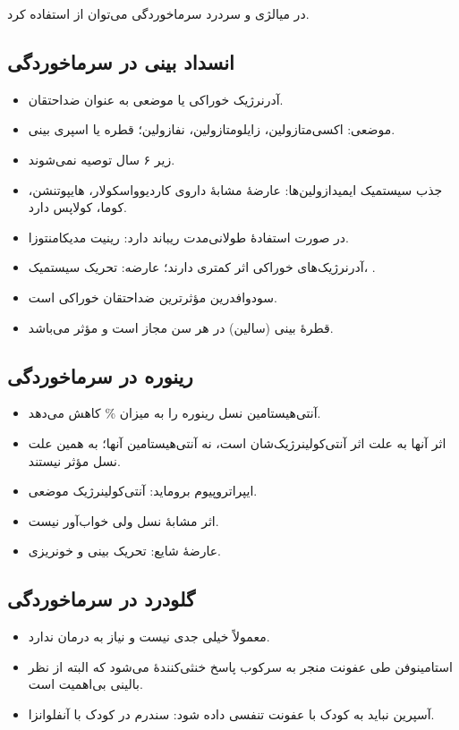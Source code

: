 \documentclass[12pt,a4paper]{article}
\begin{document}
در میالژی و سردرد سرماخوردگی می‌توان از  استفاده کرد.
\subsection*{انسداد بینی در سرماخوردگی}
\begin{itemize}
\item آدرنرژیک خوراکی یا موضعی به عنوان ضداحتقان.
\item موضعی: اکسی‌متازولین، زایلو‌متازولین، نفازولین؛ قطره یا اسپری بینی.
\item زیر ۶ سال توصیه نمی‌شوند.
\item جذب سیستمیک ایمیدازولین‌ها: عارضهٔ مشابهٔ داروی کاردیوواسکولار، هایپوتنشن، کوما، کولاپس دارد.
\item در صورت استفادهٔ طولانی‌مدت ریباند دارد: رینیت مدیکامنتوزا.
\end{itemize}

\begin{itemize}
\item آدرنرژیک‌های خوراکی اثر کمتری دارند؛ عارضه: تحریک سیستمیک، .
\item سودوافدرین مؤثرترین ضداحتقان خوراکی است.
\item قطرهٔ بینی (سالین) در هر سن مجاز است و مؤثر می‌باشد.
\end{itemize}
\subsection*{رینوره در سرماخوردگی}
\begin{itemize}
\item آنتی‌هیستامین نسل  رینوره را به میزان \% کاهش می‌دهد.
\item اثر آنها به علت اثر آنتی‌کولینرژیک‌شان است، نه آنتی‌هیستامین آنها؛ به همین علت نسل  مؤثر نیستند.
\item ایپراتروپیوم بروماید: آنتی‌کولینرژیک موضعی.
\item اثر مشابهٔ نسل  ولی خواب‌آور نیست.
\item عارضهٔ شایع: تحریک بینی و خونریزی.
\end{itemize}
\subsection*{گلودرد در سرماخوردگی}
\begin{itemize}
\item معمولاً خیلی جدی نیست و نیاز به درمان ندارد.
\item استامینوفن طی عفونت  منجر به سرکوب پاسخ خنثی‌کنندهٔ  می‌شود که البته از نظر بالینی بی‌اهمیت است.
\item آسپرین نباید به کودک با عفونت تنفسی داده شود: سندرم  در کودک با آنفلوانزا.
\end{itemize}
\end{document}

